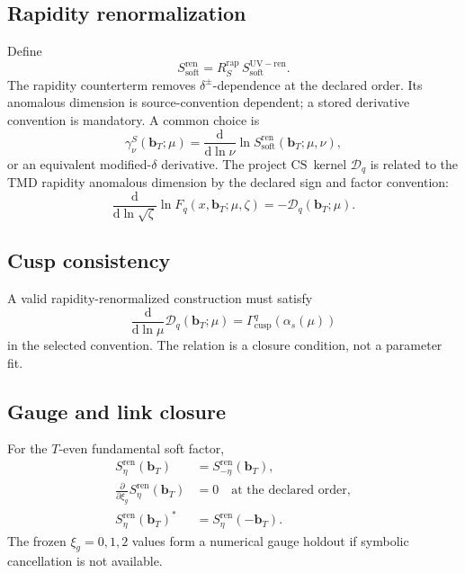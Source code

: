 \documentclass[11pt]{article}
\newcommand{\dd}{\mathrm{d}}
\newcommand{\CS}{\ensuremath{\mathrm{CS}}}
\newcommand{\bT}{\bm b_T}
\newcommand{\cD}{\mathcal D}
\newcommand{\Soft}{\ensuremath{\mathrm{soft}}}
\newcommand{\Ren}{\ensuremath{\mathrm{ren}}}
\newcommand{\as}{\alpha_s}
\begin{document}
\subsection{Rapidity renormalization}

Define
\begin{equation}
 S_{\Soft}^{\Ren}
 =
 R_S^{\mathrm{rap}}\,
 S_{\Soft}^{\mathrm{UV-ren}}.
 \label{eq:soft-rap}
\end{equation}
The rapidity counterterm removes \(\delta^\pm\)-dependence at the declared order.  Its anomalous dimension is source-convention dependent; a stored derivative convention is mandatory.  A common choice is
\begin{equation}
 \gamma_\nu^S(\bT;\mu)
 =
 \frac{\dd}{\dd\ln\nu}
 \ln S_{\Soft}^{\Ren}(\bT;\mu,\nu),
 \label{eq:soft-rad}
\end{equation}
or an equivalent modified-\(\delta\) derivative.  The project \CS\ kernel \(\cD_q\) is related to the TMD rapidity anomalous dimension by the declared sign and factor convention:
\begin{equation}
 \frac{\dd}{\dd\ln\sqrt{\zeta}}
 \ln F_q(x,\bT;\mu,\zeta)
 =
 -\cD_q(\bT;\mu).
 \label{eq:cs-evolution}
\end{equation}

\subsection{Cusp consistency}

A valid rapidity-renormalized construction must satisfy
\begin{equation}
 \frac{\dd}{\dd\ln\mu}
 \cD_q(\bT;\mu)
 =
 \Gamma_{\mathrm{cusp}}^q(\as(\mu))
 \label{eq:cusp-consistency}
\end{equation}
in the selected convention.  The relation is a closure condition, not a parameter fit.

\subsection{Gauge and link closure}

For the \(T\)-even fundamental soft factor,
\begin{align}
 S_{\eta}^{\Ren}(\bT)&=S_{-\eta}^{\Ren}(\bT),\\
 \frac{\partial}{\partial\xi_g}S_{\eta}^{\Ren}(\bT)&=0
 \quad\text{at the declared order},\\
 S_{\eta}^{\Ren}(\bT)^*&=S_{\eta}^{\Ren}(-\bT).
 \label{eq:soft-closures}
\end{align}
The frozen \(\xi_g=0,1,2\) values form a numerical gauge holdout if symbolic cancellation is not available.
\end{document}

